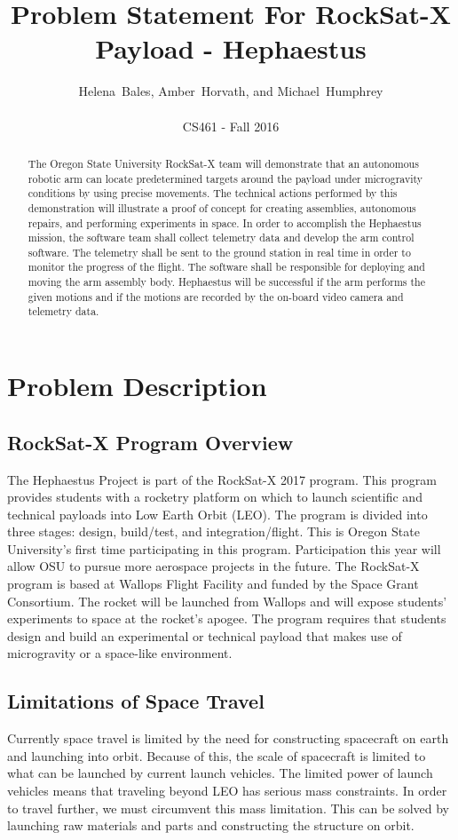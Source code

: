\documentclass[letterpaper,10pt]{article}
\title{Problem Statement For RockSat-X Payload - Hephaestus}
\author{Helena~Bales, Amber~Horvath, and Michael~Humphrey\\ \\ CS461 - Fall 2016}
\begin{document}
\maketitle

\begin{abstract}
The Oregon State University RockSat-X team will demonstrate that an autonomous robotic arm can
locate predetermined targets around the payload under microgravity conditions by using precise
movements. The technical actions performed by this demonstration will illustrate a proof of concept
for creating assemblies, autonomous repairs, and performing experiments in space. In order to
accomplish the Hephaestus mission, the software team shall collect telemetry data and develop the arm
control software. The telemetry shall be sent to the ground station in real time in order to monitor 
the progress of the flight. The software shall be responsible for deploying and moving the arm 
assembly body. Hephaestus will be successful if the arm performs the given motions and if the motions
 are recorded by the on-board video camera and telemetry data.
\end{abstract}

\clearpage

\section{Problem Description}
\subsection{RockSat-X Program Overview}
The Hephaestus Project is part of the RockSat-X 2017 program. This program provides students with a 
rocketry platform on which to launch scientific and technical payloads into Low Earth Orbit (LEO). 
The program is divided into three stages: design, build/test, and integration/flight. This is Oregon 
 State University's first time participating in this program. Participation this year will allow OSU
   to pursue more aerospace projects in the future. The RockSat-X program is based at Wallops Flight 
Facility and funded by the Space Grant Consortium. The rocket will be launched from Wallops and will
 expose students' experiments to space at the rocket's apogee. The program requires that students 
design and build an experimental or technical payload that makes use of microgravity or a space-like
environment.

\subsection{Limitations of Space Travel}
Currently space travel is limited by the need for constructing spacecraft on earth and launching into
orbit. Because of this, the scale of spacecraft is limited to what can be launched by current launch
 vehicles. The limited power of launch vehicles means that traveling beyond LEO has serious mass 
constraints. In order to travel further, we must circumvent this mass limitation. This can be 
solved by launching raw materials and parts and constructing the structure on orbit. 
\end{document}
